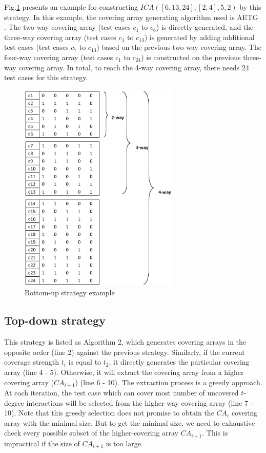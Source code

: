 \documentclass[conference]{IEEEtran}
\theoremstyle{definition}
\begin{document}
Fig.\ref{increase-example} presents an example for constructing $ICA([6,13,24];[2,4], 5, 2)$ by this strategy. In this example, the covering array generating algorithm used is AETG \cite{cohen1997aetg}. The two-way covering array (test cases $c_{1}$ to $c_{6}$) is directly generated, and the three-way covering array (test cases $c_{1}$ to $ c_{13}$) is generated by adding additional test cases (test cases $c_{7}$ to $c_{13}$) based on the previous two-way covering array. The four-way covering array (test cases $c_{1}$ to $c_{24}$) is constructed on the previous three-way covering array. In total, to reach the 4-way covering array, there needs 24 test cases for this strategy.
\begin{figure}
\center
 \includegraphics[width=3.0in]{increase_example.eps}
\caption{Bottom-up strategy example}
\label{increase-example}
\end{figure}

\subsection{Top-down strategy}
This strategy is listed as Algorithm 2, which generates covering arrays in the opposite order (line 2) against the previous strategy. Similarly, if the current coverage strength $t_{i}$ is equal to $t_{2}$, it directly generates the particular covering array (line 4 - 5). Otherwise, it will extract the covering array from a higher covering array ($CA_{i + 1}$) (line 6 - 10). The extraction process is a greedy approach. At each iteration, the test case which can cover most number of uncovered $t$-degree interactions will be selected from the higher-way covering array (line 7 - 10).  Note that this greedy selection does not promise to obtain the $CA_{i}$ covering array with the minimal size. But to get the minimal size, we need to exhaustive check every possible subset of the higher-covering array $CA_{i+1}$. This is impractical if the size of $CA_{i + 1}$ is too large.
\end{document}
